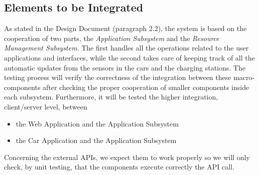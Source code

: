 \documentclass[english]{article}
\begin{document}


\subsection{Elements to be Integrated}

As stated in the Design Document (paragraph 2.2), the system is based on the cooperation of two parts, the \emph{Application Subsystem}  and the \emph{Resource Management Subsystem}. The first handles all the operations related to the user applications and interfaces, while the second takes care of keeping track of all the automatic updates from the sensors in the cars and the charging stations.
The testing process will verify the correctness of the integration between these macro-components after checking the proper cooperation of smaller components inside each subsystem.
Furthermore, it will be tested the higher integration, client/server level, between
\begin{itemize}
\item the Web Application and the Application Subsystem
\item the Car Application and the Application Subsystem
\end{itemize}
Concerning the external APIs, we expect them to work properly so we will only check, by unit testing, that the components execute correctly the API call.
\end{document}
